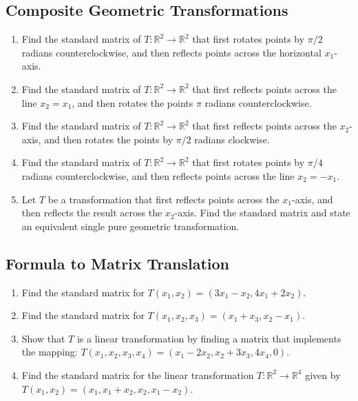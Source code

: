 \documentclass[12pt]{article}
\begin{document}
\subsection*{Composite Geometric Transformations}
\begin{enumerate}[resume]
    \item Find the standard matrix of $T: \mathbb{R}^2 \rightarrow \mathbb{R}^2$ that first rotates points by $\pi/2$ radians counterclockwise, and then reflects points across the horizontal $x_1$-axis.
    
    \item Find the standard matrix of $T: \mathbb{R}^2 \rightarrow \mathbb{R}^2$ that first reflects points across the line $x_2 = x_1$, and then rotates the points $\pi$ radians counterclockwise.
    
    \item Find the standard matrix of $T: \mathbb{R}^2 \rightarrow \mathbb{R}^2$ that first reflects points across the $x_2$-axis, and then rotates the points by $\pi/2$ radians clockwise.
    
    \item Find the standard matrix of $T: \mathbb{R}^2 \rightarrow \mathbb{R}^2$ that first rotates points by $\pi/4$ radians counterclockwise, and then reflects points across the line $x_2 = -x_1$.
    
    \item Let $T$ be a transformation that first reflects points across the $x_1$-axis, and then reflects the result across the $x_2$-axis. Find the standard matrix and state an equivalent single pure geometric transformation.
\end{enumerate}

\subsection*{Formula to Matrix Translation}
\begin{enumerate}[resume]
    \item Find the standard matrix for $T(x_1, x_2) = (3x_1 - x_2, 4x_1 + 2x_2)$.
    
    \item Find the standard matrix for $T(x_1, x_2, x_3) = (x_1 + x_3, x_2 - x_1)$.
    
    \item Show that $T$ is a linear transformation by finding a matrix that implements the mapping: $T(x_1, x_2, x_3, x_4) = (x_1 - 2x_2, x_2 + 3x_3, 4x_4, 0)$.
    
    \item Find the standard matrix for the linear transformation $T: \mathbb{R}^2 \rightarrow \mathbb{R}^4$ given by $T(x_1, x_2) = (x_1, x_1+x_2, x_2, x_1-x_2)$.
\end{enumerate}
\end{document}
